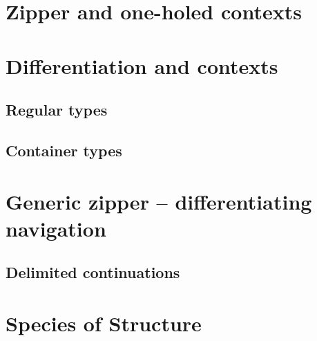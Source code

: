 \section{Zipper and one-holed contexts}

\section{Differentiation and contexts}

\subsection{Regular types}

\subsection{Container types}

\section{Generic zipper -- differentiating navigation}

\subsection{Delimited continuations}

\section{Species of Structure}